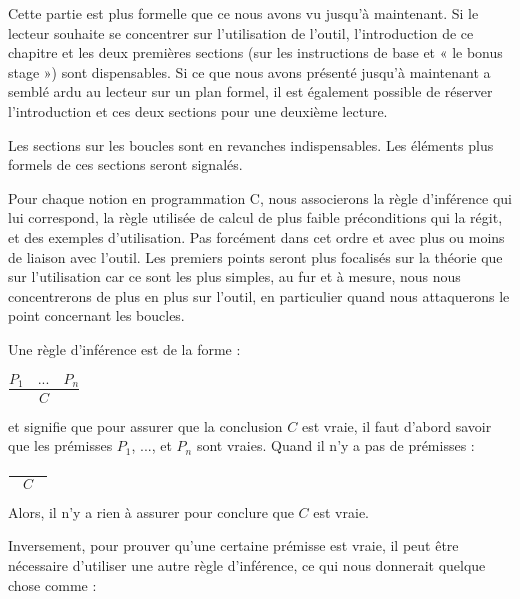 

\begin{Information}
Cette partie est plus formelle que ce nous avons vu jusqu'à maintenant. Si le 
lecteur souhaite se concentrer sur l'utilisation de l'outil, l'introduction de
ce chapitre et les deux premières sections (sur les instructions de base et « le 
bonus stage ») sont dispensables. Si ce que nous avons présenté jusqu'à maintenant
a semblé ardu au lecteur sur un plan formel, il est également possible de réserver 
l'introduction et ces deux sections pour une deuxième lecture.

Les sections sur les boucles sont en revanches indispensables. Les éléments plus
formels de ces sections seront signalés.
\end{Information}


Pour chaque notion en programmation C, nous associerons la règle d'inférence qui 
lui correspond, la règle utilisée de calcul de plus faible préconditions qui la 
régit, et des exemples d'utilisation. Pas forcément dans cet ordre et avec plus ou 
moins de liaison avec l'outil. Les premiers points seront plus focalisés sur la
théorie que sur l'utilisation car ce sont les plus simples, au fur et à mesure,
nous nous concentrerons de plus en plus sur l'outil, en particulier quand nous 
attaquerons le point concernant les boucles.





Une règle d'inférence est de la forme :




\begin{center}
$\dfrac{P_1 \quad ... \quad P_n}{C}$


\end{center}


et signifie que pour assurer que la conclusion $C$ est vraie, il faut d'abord
savoir que les prémisses $P_1$, ..., et $P_n$ sont vraies. Quand il n'y a
pas de prémisses :




\begin{center}
$\dfrac{}{\quad C \quad}$


\end{center}


Alors, il n'y a rien à assurer pour conclure que $C$ est vraie.



Inversement, pour prouver qu'une certaine prémisse est vraie, il peut être nécessaire 
d'utiliser une autre règle d'inférence, ce qui nous donnerait quelque
chose comme :




